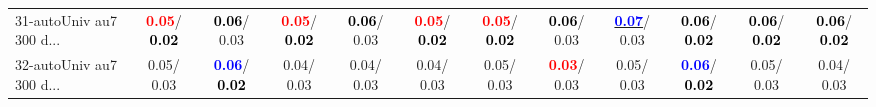 \begin{table}[h]
\begin{center}
{\begin{tabular}{lc|c|c|c|c|c|c|c|c|c|c}
31-autoUniv au7 300 d... & \textcolor{red}{\textbf{  0.05}}/\textcolor{black}{\textbf{  0.02}} & \textcolor{black}{\textbf{  0.06}}/  0.03 & \textcolor{red}{\textbf{  0.05}}/\textcolor{black}{\textbf{  0.02}} & \textcolor{black}{\textbf{  0.06}}/  0.03 & \textcolor{red}{\textbf{  0.05}}/\textcolor{black}{\textbf{  0.02}} & \textcolor{red}{\textbf{  0.05}}/\textcolor{black}{\textbf{  0.02}} & \textcolor{black}{\textbf{  0.06}}/  0.03 & \underline{\textcolor{blue}{\textbf{  0.07}}}/  0.03 & \textcolor{black}{\textbf{  0.06}}/\textcolor{black}{\textbf{  0.02}} & \textcolor{black}{\textbf{  0.06}}/\textcolor{black}{\textbf{  0.02}} & \textcolor{black}{\textbf{  0.06}}/\textcolor{black}{\textbf{  0.02}} \\
32-autoUniv au7 300 d... &   0.05/  0.03 & \textcolor{blue}{\textbf{  0.06}}/\textcolor{black}{\textbf{  0.02}} &   0.04/  0.03 &   0.04/  0.03 &   0.04/  0.03 &   0.05/  0.03 & \textcolor{red}{\textbf{  0.03}}/  0.03 &   0.05/  0.03 & \textcolor{blue}{\textbf{  0.06}}/\textcolor{black}{\textbf{  0.02}} &   0.05/  0.03 &   0.04/  0.03 \\\end{tabular}}\label{stratsALCKappa0AllReduxHalfa}
\end{center}
\end{table}

